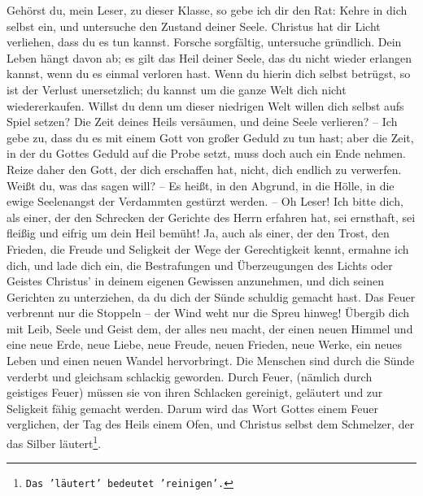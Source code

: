 Gehörst du, mein Leser, zu dieser Klasse, so gebe ich dir den Rat: Kehre in dich
selbst ein, und untersuche den Zustand deiner Seele. Christus hat dir Licht
verliehen, dass du es tun kannst. Forsche sorgfältig, untersuche gründlich. Dein
Leben hängt davon ab; es gilt das Heil deiner Seele, das du nicht wieder
erlangen kannst, wenn du es einmal verloren hast. Wenn du hierin dich selbst
betrügst, so ist der Verlust unersetzlich; du kannst um die ganze Welt dich
nicht wiedererkaufen. Willst du denn um dieser niedrigen Welt willen dich selbst
aufs Spiel setzen? Die Zeit deines Heils versäumen, und deine Seele verlieren?
-- Ich gebe zu, dass du es mit einem Gott von großer Geduld zu tun hast; aber
die Zeit, in der du Gottes Geduld auf die Probe setzt, muss doch auch ein Ende
nehmen. Reize daher den Gott, der dich erschaffen hat, nicht, dich endlich zu
verwerfen. Weißt du, was das sagen will? -- Es heißt, in den Abgrund, in die
Hölle, in die ewige Seelenangst der Verdammten gestürzt werden. -- Oh Leser! Ich
bitte dich, als einer, der den Schrecken der Gerichte des Herrn erfahren hat,
sei ernsthaft, sei fleißig und eifrig um dein Heil bemüht! Ja, auch als einer,
der den Trost, den Frieden, die Freude und Seligkeit der Wege der Gerechtigkeit
kennt, ermahne ich dich, und lade dich ein, die Bestrafungen und Überzeugungen
des Lichts oder Geistes Christus' in deinem eigenen Gewissen anzunehmen, und
dich seinen Gerichten zu unterziehen, da du dich der Sünde schuldig gemacht
hast. Das Feuer verbrennt nur die Stoppeln -- der Wind weht nur die Spreu
hinweg! Übergib dich mit Leib, Seele und Geist dem, der alles neu macht, der
einen neuen Himmel und eine neue Erde, neue Liebe, neue Freude, neuen Frieden,
neue Werke, ein neues Leben und einen neuen Wandel hervorbringt. Die Menschen
sind durch die Sünde verderbt und gleichsam schlackig geworden. Durch Feuer,
(nämlich durch geistiges Feuer) müssen sie von ihren Schlacken gereinigt,
geläutert und zur Seligkeit fähig gemacht werden. Darum wird das Wort Gottes
einem Feuer verglichen, der Tag des Heils einem Ofen, und Christus selbst dem
Schmelzer, der das Silber läutert\footnote{\texttt{Das 'läutert' bedeutet
'reinigen'.}}.

\medskip

